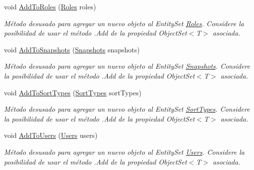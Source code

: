\begin{DoxyCompactItemize}
void \hyperlink{class_microsoft_1_1_samples_1_1_kinect_1_1_basic_interactions_1_1_o_m_k_t_d_b_entities_a3f03157467a0a640ea1538a905305605}{Add\-To\-Roles} (\hyperlink{class_microsoft_1_1_samples_1_1_kinect_1_1_basic_interactions_1_1_roles}{Roles} roles)
\begin{DoxyCompactList}\small\item\em Método desusado para agregar un nuevo objeto al Entity\-Set \hyperlink{class_microsoft_1_1_samples_1_1_kinect_1_1_basic_interactions_1_1_roles}{Roles}. Considere la posibilidad de usar el método .Add de la propiedad Object\-Set$<$T$>$ asociada. \end{DoxyCompactList}\item 
void \hyperlink{class_microsoft_1_1_samples_1_1_kinect_1_1_basic_interactions_1_1_o_m_k_t_d_b_entities_a1c368a167ccec10513af68670356f3ea}{Add\-To\-Snapshots} (\hyperlink{class_microsoft_1_1_samples_1_1_kinect_1_1_basic_interactions_1_1_snapshots}{Snapshots} snapshots)
\begin{DoxyCompactList}\small\item\em Método desusado para agregar un nuevo objeto al Entity\-Set \hyperlink{class_microsoft_1_1_samples_1_1_kinect_1_1_basic_interactions_1_1_snapshots}{Snapshots}. Considere la posibilidad de usar el método .Add de la propiedad Object\-Set$<$T$>$ asociada. \end{DoxyCompactList}\item 
void \hyperlink{class_microsoft_1_1_samples_1_1_kinect_1_1_basic_interactions_1_1_o_m_k_t_d_b_entities_a79edc6242268437179396e8000d532fe}{Add\-To\-Sort\-Types} (\hyperlink{class_microsoft_1_1_samples_1_1_kinect_1_1_basic_interactions_1_1_sort_types}{Sort\-Types} sort\-Types)
\begin{DoxyCompactList}\small\item\em Método desusado para agregar un nuevo objeto al Entity\-Set \hyperlink{class_microsoft_1_1_samples_1_1_kinect_1_1_basic_interactions_1_1_sort_types}{Sort\-Types}. Considere la posibilidad de usar el método .Add de la propiedad Object\-Set$<$T$>$ asociada. \end{DoxyCompactList}\item 
void \hyperlink{class_microsoft_1_1_samples_1_1_kinect_1_1_basic_interactions_1_1_o_m_k_t_d_b_entities_a80e9c543626eb87b8e765e246d566010}{Add\-To\-Users} (\hyperlink{class_microsoft_1_1_samples_1_1_kinect_1_1_basic_interactions_1_1_users}{Users} users)
\begin{DoxyCompactList}\small\item\em Método desusado para agregar un nuevo objeto al Entity\-Set \hyperlink{class_microsoft_1_1_samples_1_1_kinect_1_1_basic_interactions_1_1_users}{Users}. Considere la posibilidad de usar el método .Add de la propiedad Object\-Set$<$T$>$ asociada. \end{DoxyCompactList}\end{DoxyCompactItemize}

